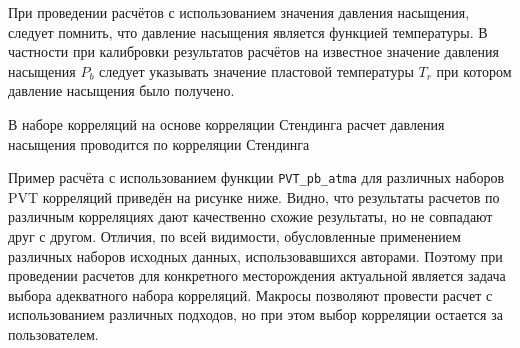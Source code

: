 При проведении расчётов с использованием значения давления насыщения, следует помнить, что давление насыщения является функцией температуры. В частности при калибровки результатов расчётов на известное значение давления насыщения $P_b$ следует указывать значение пластовой температуры $T_r$ при котором давление насыщения было получено. 

В наборе корреляций на основе корреляции Стендинга расчет давления насыщения проводится по корреляции Стендинга \cite{Yukos_PVT_2002}


Пример расчёта с использованием функции \texttt{PVT_pb_atma} для различных наборов PVT корреляций приведён на рисунке ниже. Видно, что результаты расчетов по различным корреляциях дают качественно схожие результаты, но не совпадают друг с другом.  Отличия, по всей видимости,  обусловленные применением различных наборов исходных данных, использовавшихся авторами. Поэтому при проведении расчетов для конкретного месторождения актуальной является задача выбора адекватного набора корреляций. Макросы \unf{} позволяют провести расчет с использованием различных подходов, но при этом выбор корреляции остается за пользователем. 



